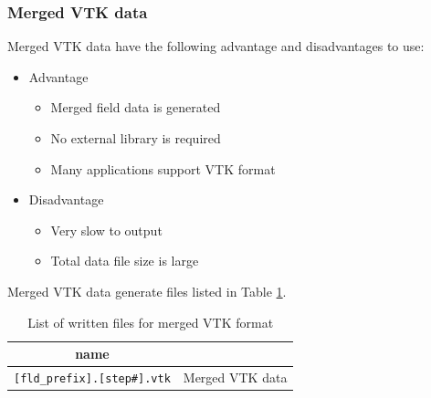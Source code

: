 \subsubsection{Merged VTK data}
Merged VTK data have the following advantage and disadvantages to use:
%
\begin{itemize}
\item Advantage
\begin{itemize} 
\item Merged field data is generated
\item No external library is required
\item Many applications support VTK format
\end{itemize}
\item Disadvantage
\begin{itemize} 
\item Very slow to output
\item Total data file size is large
\end{itemize}
\end{itemize}
%
Merged VTK data generate files listed in Table \ref{table:Merged_vtk}. 
%
\begin{table}[htdp]
\caption{List of written files for merged VTK format}
\begin{center} 
\begin{tabular}{|c|c|}
\hline
 name &  \\ \hline \hline
\verb|[fld_prefix].[step#].vtk|  & Merged VTK data  \\ \hline
\end{tabular}
\end{center}
\label{table:Merged_vtk}
\end{table}
%

